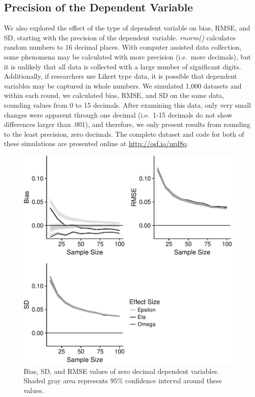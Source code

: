 \documentclass[english,man]{apa6}
\theoremstyle{definition}
\theoremstyle{definition}
\theoremstyle{definition}
\theoremstyle{remark}
\begin{document}
\subsection{Precision of the Dependent
Variable}\label{precision-of-the-dependent-variable}

We also explored the effect of the type of dependent variable on bias,
RMSE, and SD, starting with the precision of the dependent variable.
\emph{rnorm()} calculates random numbers to 16 decimal places. With
computer assisted data collection, some phenomena may be calculated with
more precision (i.e.~more decimals), but it is unlikely that all data is
collected with a large number of significant digits. Additionally, if
researchers use Likert type data, it is possible that dependent
variables may be captured in whole numbers. We simulated 1,000 datasets
and within each round, we calculated bias, RMSE, and SD on the same
data, rounding values from 0 to 15 decimals. After examining this data,
only very small changes were apparent through one decimal (i.e.~1-15
decimals do not show differences larger than .001), and therefore, we
only present results from rounding to the least precision, zero
decimals. The complete dataset and code for both of these simulations
are presented online at \url{http://osf.io/urd8q}.

\begin{figure}[htbp]
\centering
\includegraphics{buchanan_scofield_files/figure-latex/decimal-graph-1.pdf}
\caption{\label{fig:decimal-graph}Bias, SD, and RMSE values of zero decimal
dependent variables. Shaded gray area represents 95\% confidence
interval around these values.}
\end{figure}
\end{document}

